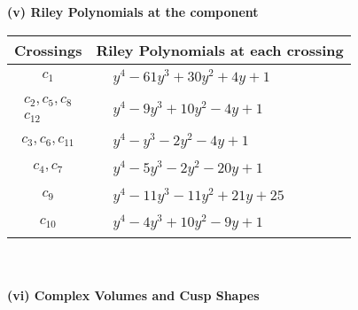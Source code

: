 \documentclass[1p]{elsarticle_modified}
\theoremstyle{definition}
\begin{document}
\newpage\renewcommand{\arraystretch}{1}
\flushleft \textbf{(v) Riley Polynomials at the component}\newline \\
\begin{tabular}{m{50pt}|m{274pt}}
Crossings & \hspace{64pt}Riley Polynomials at each crossing \\
\hline $$\begin{aligned}c_{1}\end{aligned}$$&$\begin{aligned}
&y^4-61 y^3+30 y^2+4 y+1
\end{aligned}$\\
\hline $$\begin{aligned}c_{2},c_{5},c_{8}\\c_{12}\end{aligned}$$&$\begin{aligned}
&y^4-9 y^3+10 y^2-4 y+1
\end{aligned}$\\
\hline $$\begin{aligned}c_{3},c_{6},c_{11}\end{aligned}$$&$\begin{aligned}
&y^4- y^3-2 y^2-4 y+1
\end{aligned}$\\
\hline $$\begin{aligned}c_{4},c_{7}\end{aligned}$$&$\begin{aligned}
&y^4-5 y^3-2 y^2-20 y+1
\end{aligned}$\\
\hline $$\begin{aligned}c_{9}\end{aligned}$$&$\begin{aligned}
&y^4-11 y^3-11 y^2+21 y+25
\end{aligned}$\\
\hline $$\begin{aligned}c_{10}\end{aligned}$$&$\begin{aligned}
&y^4-4 y^3+10 y^2-9 y+1
\end{aligned}$\\
\hline
\end{tabular}\\~\\
\newpage\flushleft \textbf{(vi) Complex Volumes and Cusp Shapes}
\end{document}
